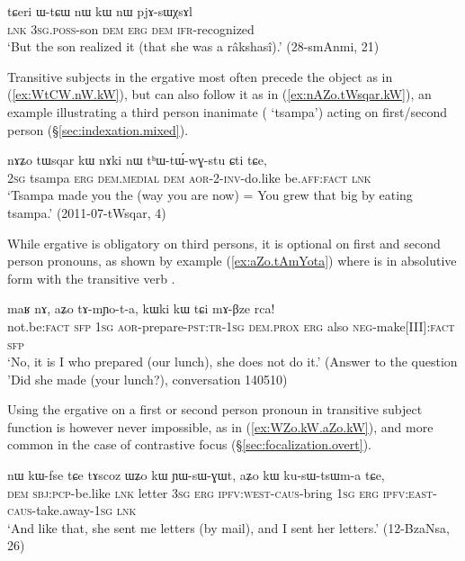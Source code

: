 \begin{exe}
\ex \label{ex:WtCW.nW.kW}
\gll tɕeri ɯ-tɕɯ nɯ kɯ nɯ pjɤ-sɯχsɤl \\
\textsc{lnk} \textsc{3sg}.\textsc{poss}-son \textsc{dem} \textsc{erg} \textsc{dem} \textsc{ifr}-recognized \\
\glt `But the son realized it (that she was a râkshasî).' (28-smAnmi, 21)
\end{exe}

Transitive subjects in the ergative most often precede the object as in (\ref{ex:WtCW.nW.kW}), but can also follow it as in (\ref{ex:nAZo.tWsqar.kW}), an example illustrating a third person inanimate ( `tsampa') acting on first/second person (§\ref{sec:indexation.mixed}).

\begin{exe}
\ex \label{ex:nAZo.tWsqar.kW}
\gll nɤʑo tɯsqar kɯ nɤki nɯ tʰɯ-tɯ́-wɣ-stu ɕti tɕe,  \\
\textsc{2sg} tsampa \textsc{erg} \textsc{dem}.\textsc{medial} \textsc{dem} \textsc{aor}-2-\textsc{inv}-do.like be.\textsc{aff}:\textsc{fact} \textsc{lnk} \\
\glt `Tsampa made you the (way you are now) = You grew that big by eating tsampa.' (2011-07-tWsqar, 4)
\end{exe}

While ergative is obligatory on third persons, it is optional on first and second person pronouns, as shown by example (\ref{ex:aZo.tAmYota}) where  is in absolutive form with the transitive verb . 

\begin{exe}
\ex \label{ex:aZo.tAmYota}
\gll maʁ nɤ, aʑo tɤ-mɲo-t-a, kɯki kɯ tɕi mɤ-βze rca!  \\
not.be:\textsc{fact} \textsc{sfp} \textsc{1sg} \textsc{aor}-prepare-\textsc{pst}:\textsc{tr}-\textsc{1sg} \textsc{dem}.\textsc{prox} \textsc{erg} also \textsc{neg}-make[III]:\textsc{fact} \textsc{sfp} \\
\glt `No, it is I who prepared (our lunch), she does not do it.' (Answer to the question 'Did she made (your lunch?), conversation 140510)
\end{exe}

Using the ergative on a first  or second person pronoun in transitive subject function is however never impossible, as in (\ref{ex:WZo.kW.aZo.kW}), and more common in the case of contrastive focus (§\ref{sec:focalization.overt}).

\begin{exe}
\ex \label{ex:WZo.kW.aZo.kW}
\gll nɯ kɯ-fse tɕe tɤscoz ɯʑo kɯ ɲɯ-sɯ-ɣɯt, aʑo kɯ ku-sɯ-tsɯm-a tɕe, \\
\textsc{dem} \textsc{sbj}:\textsc{pcp}-be.like \textsc{lnk} letter \textsc{3sg} \textsc{erg} \textsc{ipfv}:\textsc{west}-\textsc{caus}-bring \textsc{1sg} \textsc{erg} \textsc{ipfv}:\textsc{east}-\textsc{caus}-take.away-\textsc{1sg} \textsc{lnk} \\
\glt `And like that, she sent me letters (by mail), and I sent her letters.' (12-BzaNsa, 26)
\end{exe}

